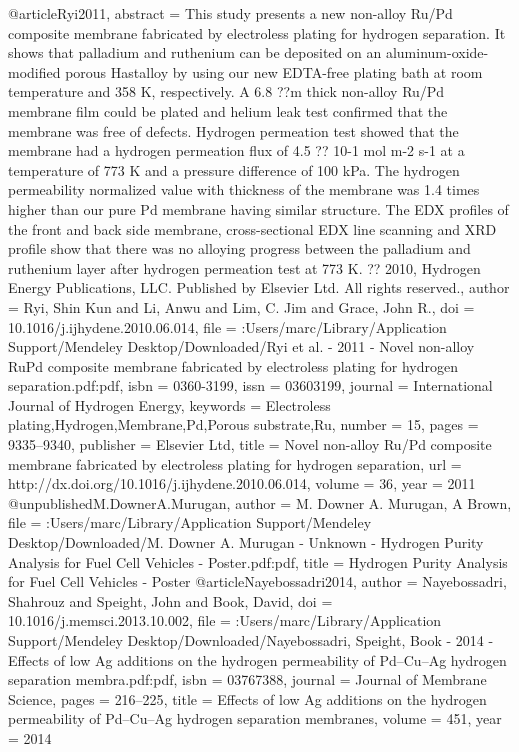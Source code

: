 @article{Ryi2011,
abstract = {This study presents a new non-alloy Ru/Pd composite membrane fabricated by electroless plating for hydrogen separation. It shows that palladium and ruthenium can be deposited on an aluminum-oxide-modified porous Hastalloy by using our new EDTA-free plating bath at room temperature and 358 K, respectively. A 6.8 ??m thick non-alloy Ru/Pd membrane film could be plated and helium leak test confirmed that the membrane was free of defects. Hydrogen permeation test showed that the membrane had a hydrogen permeation flux of 4.5 ?? 10-1 mol m-2 s-1 at a temperature of 773 K and a pressure difference of 100 kPa. The hydrogen permeability normalized value with thickness of the membrane was 1.4 times higher than our pure Pd membrane having similar structure. The EDX profiles of the front and back side membrane, cross-sectional EDX line scanning and XRD profile show that there was no alloying progress between the palladium and ruthenium layer after hydrogen permeation test at 773 K. ?? 2010, Hydrogen Energy Publications, LLC. Published by Elsevier Ltd. All rights reserved.},
author = {Ryi, Shin Kun and Li, Anwu and Lim, C. Jim and Grace, John R.},
doi = {10.1016/j.ijhydene.2010.06.014},
file = {:Users/marc/Library/Application Support/Mendeley Desktop/Downloaded/Ryi et al. - 2011 - Novel non-alloy RuPd composite membrane fabricated by electroless plating for hydrogen separation.pdf:pdf},
isbn = {0360-3199},
issn = {03603199},
journal = {International Journal of Hydrogen Energy},
keywords = {Electroless plating,Hydrogen,Membrane,Pd,Porous substrate,Ru},
number = {15},
pages = {9335--9340},
publisher = {Elsevier Ltd},
title = {{Novel non-alloy Ru/Pd composite membrane fabricated by electroless plating for hydrogen separation}},
url = {http://dx.doi.org/10.1016/j.ijhydene.2010.06.014},
volume = {36},
year = {2011}
}
@unpublished{M.DownerA.Murugan,
author = {{M. Downer A. Murugan}, A Brown},
file = {:Users/marc/Library/Application Support/Mendeley Desktop/Downloaded/M. Downer A. Murugan - Unknown - Hydrogen Purity Analysis for Fuel Cell Vehicles - Poster.pdf:pdf},
title = {{Hydrogen Purity Analysis for Fuel Cell Vehicles - Poster}}
}
@article{Nayebossadri2014,
author = {Nayebossadri, Shahrouz and Speight, John and Book, David},
doi = {10.1016/j.memsci.2013.10.002},
file = {:Users/marc/Library/Application Support/Mendeley Desktop/Downloaded/Nayebossadri, Speight, Book - 2014 - Effects of low Ag additions on the hydrogen permeability of Pd–Cu–Ag hydrogen separation membra.pdf:pdf},
isbn = {03767388},
journal = {Journal of Membrane Science},
pages = {216--225},
title = {{Effects of low Ag additions on the hydrogen permeability of Pd–Cu–Ag hydrogen separation membranes}},
volume = {451},
year = {2014}
}

